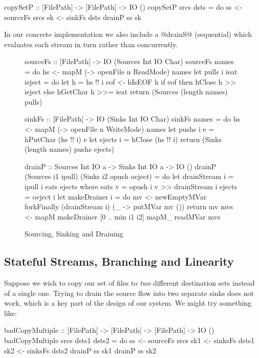 \begin{code}
 copySetP :: [FilePath] -> [FilePath] -> IO ()
 copySetP srcs dsts
  = do  ss <- sourceFs srcs
        sk <- sinkFs   dsts
        drainP ss sk
\end{code}

In our concrete implementation we also include a @drainS@ (sequential) which evaluates each stream in turn rather than concurrently.
\begin{figure}
\begin{code}
sourceFs :: [FilePath] -> IO (Sources Int IO Char)
sourceFs names 
 = do hs <- mapM (\n -> openFile n ReadMode) names
      let pulls i ieat ieject
          = do let h = hs !! i
               eof <- hIsEOF h
               if eof then hClose   h >> ieject
                      else hGetChar h >>= ieat
      return (Sources (length names) pulls)

sinkFs  :: [FilePath] -> IO (Sinks Int IO Char)
sinkFs names 
 = do hs <- mapM (\n -> openFile n WriteMode) names
      let pushs  i e = hPutChar (hs !! i) e
      let ejects i   = hClose   (hs !! i)
      return (Sinks (length names) pushs ejects)

drainP :: Sources Int IO a -> Sinks Int IO a -> IO ()
drainP (Sources i1 ipull) (Sinks i2 opush oeject) 
 = do let drainStream i
          = ipull i eats ejects 
          where eats v = opush i v >> drainStream i
                ejects = oeject i
      let makeDrainer i 
          = do mv <- newEmptyMVar 
               forkFinally (drainStream i) 
                           (\_ -> putMVar mv ())
               return mv 
      mvs <- mapM makeDrainer [0 .. min i1 i2]
      mapM_ readMVar mvs
\end{code}

\caption{Sourcing, Sinking and Draining}
\label{f:Draining}
\end{figure}


\subsection{Stateful Streams, Branching and Linearity}
Suppose we wish to copy our set of files to \emph{two} different destination sets instead of a single one. Trying to drain the source flow into two separate sinks does not work, which is a key part of the design of our system. We might try something like:

\begin{code}
 badCopyMultiple 
  :: [FilePath] -> [FilePath] -> [FilePath] -> IO ()
 badCopyMultiple srcs dsts1 dsts2
  = do  ss  <- sourceFs srcs
        sk1 <- sinksFs  dsts1
        sk2 <- sinksFs  dsts2
        drainP ss sk1
        drainP ss sk2
\end{code}


